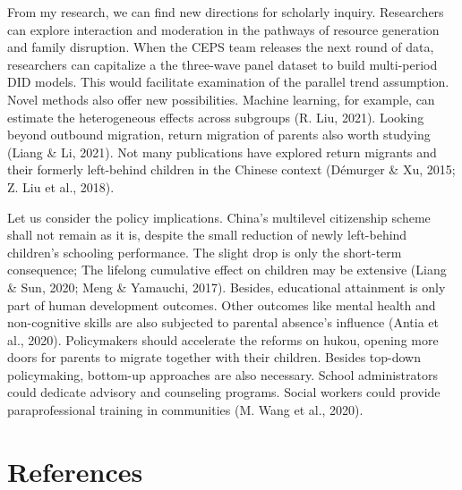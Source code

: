 \documentclass[
  man,floatsintext]{apa7}
\begin{document}
From my research, we can find new directions for scholarly inquiry. Researchers can explore interaction and moderation in the pathways of resource generation and family disruption. When the CEPS team releases the next round of data, researchers can capitalize a the three-wave panel dataset to build multi-period DID models. This would facilitate examination of the parallel trend assumption. Novel methods also offer new possibilities. Machine learning, for example, can estimate the heterogeneous effects across subgroups (R. Liu, 2021). Looking beyond outbound migration, return migration of parents also worth studying (Liang \& Li, 2021). Not many publications have explored return migrants and their formerly left-behind children in the Chinese context (Démurger \& Xu, 2015; Z. Liu et al., 2018).

Let us consider the policy implications. China's multilevel citizenship scheme shall not remain as it is, despite the small reduction of newly left-behind children's schooling performance. The slight drop is only the short-term consequence; The lifelong cumulative effect on children may be extensive (Liang \& Sun, 2020; Meng \& Yamauchi, 2017). Besides, educational attainment is only part of human development outcomes. Other outcomes like mental health and non-cognitive skills are also subjected to parental absence's influence (Antia et al., 2020). Policymakers should accelerate the reforms on hukou, opening more doors for parents to migrate together with their children. Besides top-down policymaking, bottom-up approaches are also necessary. School administrators could dedicate advisory and counseling programs. Social workers could provide paraprofessional training in communities (M. Wang et al., 2020).

\newpage

\hypertarget{references}{%
\section{References}\label{references}}
\end{document}
